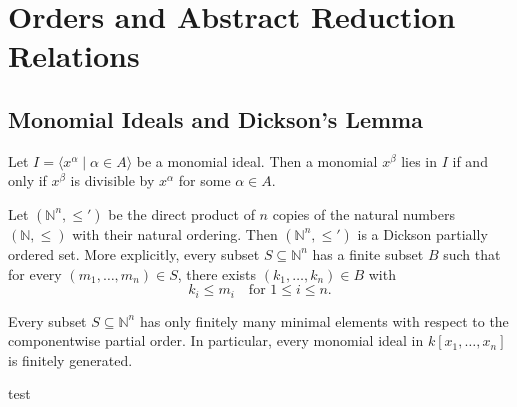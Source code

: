 \chapter{Orders and Abstract Reduction Relations} 

\section{Monomial Ideals and Dickson’s Lemma}

\begin{lemma}\label{lem:monomial_ideal}
    Let $I = \langle x^\alpha \mid \alpha \in A \rangle$ be a monomial ideal.
    Then a monomial $x^\beta$ lies in $I$ if and only if $x^\beta$ is divisible by $x^\alpha$ for some $\alpha \in A$.
\end{lemma}

\begin{theorem}\label{thm:Dickson} %
    Let $(\mathbb{N}^n, \le')$ be the direct product of $n$ copies of the natural numbers $(\mathbb{N}, \le)$ with their natural ordering. 
    Then $(\mathbb{N}^n, \le')$ is a Dickson partially ordered set. 
    More explicitly, every subset $S \subseteq \mathbb{N}^n$ has a finite subset $B$ such that for every $(m_1, \dots, m_n) \in S$, there exists $(k_1, \dots, k_n) \in B$ with
    \[
    k_i \le m_i \quad \text{for } 1 \le i \le n.
    \]
\end{theorem}

\begin{theorem}\label{thm:Dickson'}
    Every subset $S\subseteq \mathbb{N}^n$ has only finitely many minimal elements with respect to the componentwise partial order. 
    In particular, every monomial ideal in $k[x_1,\dots,x_n]$ is finitely generated.
\end{theorem}

\begin{theorem}
    test
\end{theorem}